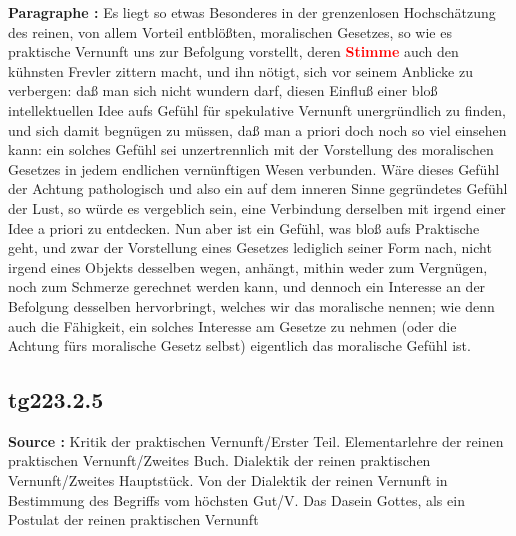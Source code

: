 \documentclass[a4paper,12pt,twoside]{book}
\newcommand{\match}[1]{\textcolor{red}{\textbf{#1}}}
\begin{document}
	\noindent\textbf{Paragraphe : }Es liegt so etwas Besonderes in der grenzenlosen Hochschätzung des reinen, von allem Vorteil entblößten, moralischen Gesetzes, so wie es praktische Vernunft uns zur Befolgung vorstellt, deren \match{Stimme} auch den kühnsten Frevler zittern macht, und ihn nötigt, sich vor seinem Anblicke zu verbergen: daß man sich nicht wundern darf, diesen Einfluß einer bloß intellektuellen Idee aufs Gefühl für spekulative Vernunft unergründlich zu finden, und sich damit begnügen zu müssen, daß man a priori doch noch so viel einsehen kann: ein solches Gefühl sei unzertrennlich mit der Vorstellung des moralischen Gesetzes in jedem endlichen vernünftigen Wesen verbunden. Wäre dieses Gefühl der Achtung pathologisch und also ein auf dem inneren Sinne gegründetes Gefühl der Lust, so würde es vergeblich sein, eine Verbindung derselben mit irgend einer Idee a priori zu entdecken. Nun aber ist ein Gefühl, was bloß aufs Praktische geht, und zwar der Vorstellung eines Gesetzes lediglich seiner Form nach, nicht irgend eines Objekts desselben wegen, anhängt, mithin weder zum Vergnügen, noch zum Schmerze gerechnet werden kann, und dennoch ein Interesse an der Befolgung desselben hervorbringt, welches wir das moralische nennen; wie denn auch die Fähigkeit, ein solches  Interesse am Gesetze zu nehmen (oder die Achtung fürs moralische Gesetz selbst) eigentlich das moralische Gefühl ist. 
	
	\subsection*{tg223.2.5} 
	\textbf{Source : }Kritik der praktischen Vernunft/Erster Teil. Elementarlehre der reinen praktischen Vernunft/Zweites Buch. Dialektik der reinen praktischen Vernunft/Zweites Hauptstück. Von der Dialektik der reinen Vernunft in Bestimmung des Begriffs vom höchsten Gut/V. Das Dasein Gottes, als ein Postulat der reinen praktischen Vernunft\\  
	
\end{document}
